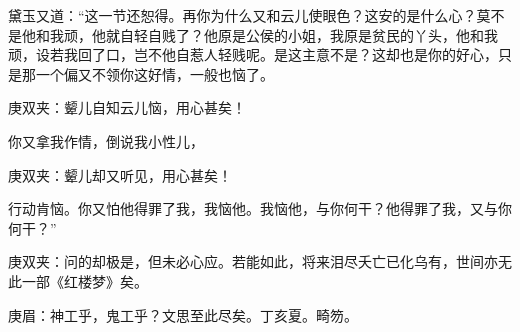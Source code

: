 \begin{parag}
    黛玉又道：“这一节还恕得。再你为什么又和云儿使眼色？这安的是什么心？莫不是他和我顽，他就自轻自贱了？他原是公侯的小姐，我原是贫民的丫头，他和我顽，设若我回了口，岂不他自惹人轻贱呢。是这主意不是？这却也是你的好心，只是那一个偏又不领你这好情，一般也恼了。\begin{note}庚双夹：颦儿自知云儿恼，用心甚矣！\end{note}你又拿我作情，倒说我小性儿，\begin{note}庚双夹：颦儿却又听见，用心甚矣！\end{note}行动肯恼。你又怕他得罪了我，我恼他。我恼他，与你何干？他得罪了我，又与你何干？”\begin{note}庚双夹：问的却极是，但未必心应。若能如此，将来泪尽夭亡已化乌有，世间亦无此一部《红楼梦》矣。\end{note}\begin{note}庚眉：神工乎，鬼工乎？文思至此尽矣。丁亥夏。畸笏。\end{note}
\end{parag}


